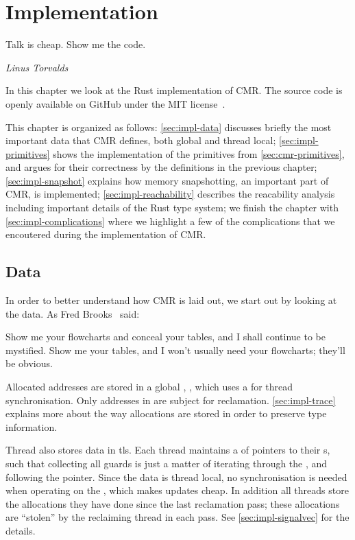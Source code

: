 \chapter{Implementation\label{ch:implementation}}

\epigraph{Talk is cheap. Show me the code.}{\textit{Linus Torvalds}}

In this chapter we look at the Rust implementation of CMR\@. The source code is openly available
on GitHub under the MIT license~\cite{cmr-github}.

This chapter is organized as follows: \cref{sec:impl-data} discusses briefly the most important
data that CMR defines, both global and thread local;
\cref{sec:impl-primitives} shows the implementation of the primitives from
\cref{sec:cmr-primitives}, and argues for their correctness by the definitions in the previous
chapter;
\cref{sec:impl-snapshot} explains how memory snapshotting, an important part of CMR, is
implemented;
\cref{sec:impl-reachability} describes the reacability analysis including important details of the
Rust type system;
we finish the chapter with \cref{sec:impl-complications} where we highlight a few of the
complications that we encoutered during the implementation of CMR.

\clearpage

\section{Data\label{sec:impl-data}}

In order to better understand how CMR is laid out, we start out by looking at the data.
As Fred Brooks~\cite{brooks1995mythical} said:
\begin{displayquote}
Show me your flowcharts and conceal your tables, and I shall continue to be mystified. Show me your
  tables, and I won't usually need your flowcharts; they'll be obvious.
\end{displayquote}

Allocated addresses are stored in a global , , which uses a 
for thread synchronisation. Only addresses in  are subject for reclamation.
\cref{sec:impl-trace} explains more about the way allocations are stored in order to preserve type
information.

Thread also stores data in \gls{tls}. Each thread maintains a  of pointers to their
s, such that collecting all guards is just a matter of iterating through the
, and following the pointer. Since the data is thread local, no synchronisation is needed
when operating on the , which makes updates cheap.
In addition all threads store the allocations they have done since the last reclamation pass;
these allocations are ``stolen'' by the reclaiming thread in each pass. See
\cref{sec:impl-signalvec} for the details.

